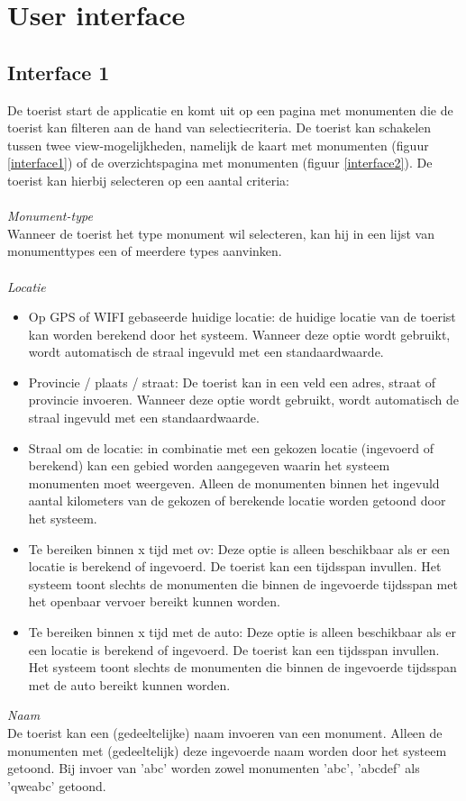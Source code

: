 \documentclass[a4paper,10pt]{article}
\newcommand{\rsection}[1]{
\section{#1}\label{sec:#1}
}
\newcommand{\rsubsection}[1]{
\subsection{#1}\label{sec:sub:#1}
}
\begin{document}
		\clearpage			
		\rsection{User interface}
			\rsubsection{Interface 1}
			De toerist start de applicatie en komt uit op een pagina met monumenten die de toerist kan filteren aan de hand van selectiecriteria. De toerist kan schakelen tussen twee view-mogelijkheden, namelijk de kaart met monumenten (figuur \ref{interface1}) of de overzichtspagina met monumenten (figuur \ref{interface2}). De toerist kan hierbij selecteren op een aantal criteria:\\
			\\
			\textit{Monument-type}\\
			Wanneer de toerist het type monument wil selecteren, kan hij in een lijst van monumenttypes een of meerdere types aanvinken.\\
			\\
			\textit{Locatie}
			\begin{itemize}
				\item Op GPS of WIFI gebaseerde huidige locatie: de huidige locatie van de toerist kan worden berekend door het systeem. Wanneer deze optie wordt gebruikt, wordt automatisch de straal ingevuld met een standaardwaarde. 
				\item Provincie / plaats / straat: De toerist kan in een veld een adres, straat of provincie invoeren. Wanneer deze optie wordt gebruikt, wordt automatisch de straal ingevuld met een standaardwaarde.
				\item Straal om de locatie: in combinatie met een gekozen locatie (ingevoerd of berekend) kan een gebied worden aangegeven waarin het systeem monumenten moet weergeven. Alleen de monumenten binnen het ingevuld aantal kilometers van de gekozen of berekende locatie worden getoond door het systeem.
				\item Te bereiken binnen x tijd met ov: Deze optie is alleen beschikbaar als er een locatie is berekend of ingevoerd. De toerist kan een tijdsspan invullen. Het systeem toont slechts de monumenten die binnen de ingevoerde tijdsspan met het openbaar vervoer bereikt kunnen worden.
				\item Te bereiken binnen x tijd met de auto: Deze optie is alleen beschikbaar als er een locatie is berekend of ingevoerd. De toerist kan een tijdsspan invullen. Het systeem toont slechts de monumenten die binnen de ingevoerde tijdsspan met de auto bereikt kunnen worden.
			\end{itemize}
			\textit{Naam}\\
			De toerist kan een (gedeeltelijke) naam invoeren van een monument. Alleen de monumenten met (gedeeltelijk) deze ingevoerde naam worden door het systeem getoond. Bij invoer van 'abc' worden zowel monumenten 'abc', 'abcdef' als 'qweabc' getoond.\\
\end{document}
